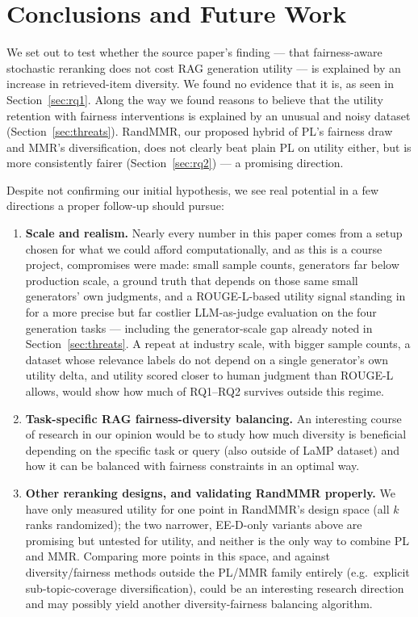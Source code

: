 \documentclass[10pt,twocolumn]{article}
\begin{document}
\FloatBarrier
\section{Conclusions and Future Work}
\label{sec:conclusion}

We set out to test whether the source paper's finding --- that fairness-aware
stochastic reranking does not cost RAG generation utility --- is explained by an
increase in retrieved-item diversity. We found no evidence that it is, as seen
in Section~\ref{sec:rq1}. Along the way we found reasons to believe that the
utility retention with fairness interventions is explained by an unusual and
noisy dataset (Section~\ref{sec:threats}). RandMMR, our proposed hybrid of
PL's fairness draw and MMR's diversification, does not clearly beat plain PL
on utility either, but is more consistently fairer (Section~\ref{sec:rq2}) ---
a promising direction.

Despite not confirming our initial hypothesis, we see real potential in a few
directions a proper follow-up should pursue:

\begin{enumerate}[leftmargin=1.1em,itemsep=3pt]
  \item \textbf{Scale and realism.} Nearly every number in this paper comes
  from a setup chosen for what we could afford computationally, and as this is a course project, compromises were made:
  small sample counts, generators far below production scale, a ground
  truth that depends on those same small generators' own judgments, and a
  ROUGE-L-based utility signal standing in for a more precise but far costlier
  LLM-as-judge evaluation on the four generation tasks --- including the
  generator-scale gap already noted in Section~\ref{sec:threats}. A repeat at
  industry scale, with bigger sample counts, a
  dataset whose relevance labels do not depend on a single generator's own
  utility delta, and utility scored closer to human judgment than ROUGE-L
  allows, would show how much of RQ1--RQ2 survives outside this regime.
  \item \textbf{Task-specific RAG fairness-diversity balancing.} An interesting course of research in our opinion would be to study how much diversity is beneficial depending on the specific task or query (also outside of LaMP dataset) and how it can be balanced with fairness constraints in an optimal way.
  \item \textbf{Other reranking designs, and validating RandMMR properly.} We have
  only measured utility for one point in RandMMR's design space (all $k$ ranks
  randomized); the two narrower, EE-D-only variants above are promising but
  untested for utility, and neither is the only way to combine PL and MMR.
  Comparing more points in this space, and against diversity/fairness methods
  outside the PL/MMR family entirely (e.g.\ explicit sub-topic-coverage
  diversification), could be an interesting research direction and may possibly
  yield another diversity-fairness balancing algorithm.
\end{enumerate}
\end{document}
